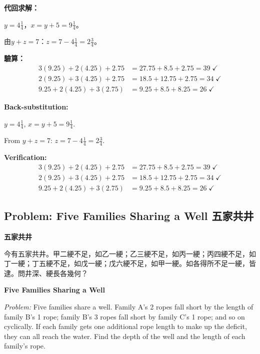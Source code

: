 \documentclass[11pt,a4paper]{article}
\newcommand{\zh}[1]{{\CJKfamily{\CJKrmdefault} #1}}
\newenvironment{chside}{%
  \begin{minipage}[t]{0.48\textwidth}%
  \setlength{\parindent}{1.5em}%
  \linespread{1.25}\selectfont%
  \small%
}{%
  \end{minipage}%
}
\newenvironment{enside}{%
  \hfill\begin{minipage}[t]{0.48\textwidth}%
  \setlength{\parindent}{1em}%
  \linespread{1.15}\selectfont%
  \small%
}{%
  \end{minipage}%
}
\begin{document}
\noindent\begin{chside}
\noindent\textbf{代回求解：}

$y = 4\frac{1}{4}$，$x = y + 5 = 9\frac{1}{4}$。

由$y + z = 7$：$z = 7 - 4\frac{1}{4} = 2\frac{3}{4}$。

\textbf{驗算：}
\begin{align*}
3(9.25) + 2(4.25) + 2.75 &= 27.75 + 8.5 + 2.75 = 39 \; \checkmark \\
2(9.25) + 3(4.25) + 2.75 &= 18.5 + 12.75 + 2.75 = 34 \; \checkmark \\
9.25 + 2(4.25) + 3(2.75) &= 9.25 + 8.5 + 8.25 = 26 \; \checkmark
\end{align*}
\end{chside}%
\begin{enside}
\noindent\textbf{Back-substitution:}

$y = 4\frac{1}{4}$, $x = y + 5 = 9\frac{1}{4}$.

From $y + z = 7$: $z = 7 - 4\frac{1}{4} = 2\frac{3}{4}$.

\textbf{Verification:}
\begin{align*}
3(9.25) + 2(4.25) + 2.75 &= 27.75 + 8.5 + 2.75 = 39 \; \checkmark \\
2(9.25) + 3(4.25) + 2.75 &= 18.5 + 12.75 + 2.75 = 34 \; \checkmark \\
9.25 + 2(4.25) + 3(2.75) &= 9.25 + 8.5 + 8.25 = 26 \; \checkmark
\end{align*}
\end{enside}

\subsection{Problem: Five Families Sharing a Well \zh{五家共井}}

\noindent\begin{chside}
\noindent\textbf{五家共井}

\zh{今有五家共井。甲二綆不足，如乙一綆；乙三綆不足，如丙一綆；丙四綆不足，如丁一綆；丁五綆不足，如戊一綆；戊六綆不足，如甲一綆。如各得所不足一綆，皆逮。問井深、綆長各幾何？}
\end{chside}%
\begin{enside}
\noindent\textbf{Five Families Sharing a Well}

\textit{Problem:} Five families share a well. Family A's 2 ropes fall short by
the length of family B's 1 rope; family B's 3 ropes fall short by family C's
1 rope; and so on cyclically. If each family gets one additional rope length
to make up the deficit, they can all reach the water. Find the depth of the
well and the length of each family's rope.
\end{enside}
\end{document}
